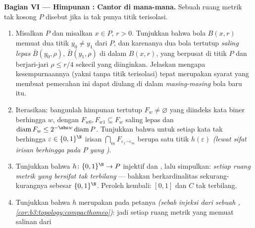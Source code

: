 \begin{problem}
\medskip
\noindent\textbf{Bagian VI --- Himpunan  : Cantor
di mana-mana.} Sebuah ruang metrik  tak kosong $P$ disebut
\emph{} jika ia tak punya titik terisolasi.
\begin{enumerate}[resume]
  \item Misalkan $P$   dan misalkan $x \in P$, $r > 0$.
        Tunjukkan bahwa bola $B(x, r)$ memuat dua titik $y_0
        \neq y_1$ dari $P$, dan karenanya dua bola tertutup
        \emph{saling lepas} $\bar B(y_0, \rho)$, $\bar B(y_1, \rho)$ di dalam
        $B(x, r)$, yang berpusat di titik $P$ dan berjari-jari $\rho
        \leq r/4$ sekecil yang diinginkan. Jelaskan mengapa kesempurnaannya
        (yakni tanpa titik terisolasi) tepat merupakan syarat yang membuat pemecahan
        ini dapat diulang di dalam \emph{masing-masing} bola
        baru itu.
  \item Iterasikan: bangunlah himpunan tertutup $F_w \neq \varnothing$
        yang diindeks kata biner berhingga $w$, dengan $F_{w0},
        F_{w1} \subseteq F_w$ saling lepas dan
        $\operatorname{diam}F_w \leq 2^{-\abs w}
        \operatorname{diam}P$. Tunjukkan bahwa untuk setiap kata tak
        berhingga $\varepsilon \in \{0,1\}^\N$ irisan
        $\bigcap_mF_{\varepsilon_1\cdots\varepsilon_m}$ berupa
        satu titik $h(\varepsilon)$ \emph{(lewat sifat irisan
        berhingga pada $P$ yang )}.
  \item Tunjukkan bahwa $h\colon\{0,1\}^\N \to P$ injektif dan
        , lalu simpulkan: \emph{setiap ruang metrik 
        yang  bersifat tak terbilang} --- bahkan berkardinalitas
        sekurang-kurangnya sebesar $\{0,1\}^\N$. Peroleh kembali: $[0,1]$ dan $C$
        tak terbilang.
  \item Tunjukkan bahwa $h$ merupakan  pada petanya
        \emph{(sebab injeksi  dari sebuah ,
        \cref{cor:b3:topology:compacthomeo})}: jadi setiap ruang metrik
         yang  memuat salinan  dari

\end{enumerate}
\end{problem}
